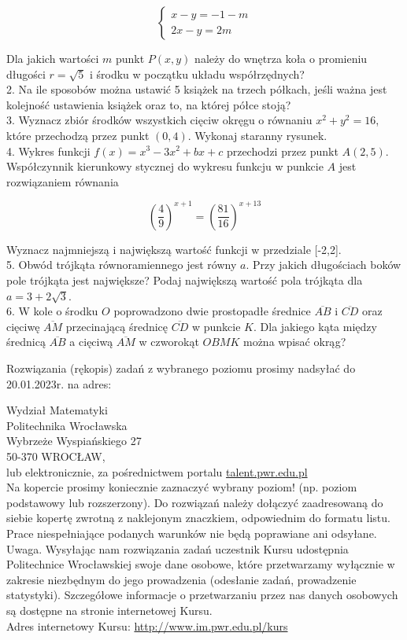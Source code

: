 \documentclass[10pt]{article}
\begin{document}
$$
\left\{\begin{array}{l}
x-y=-1-m \\
2 x-y=2 m
\end{array}\right.
$$

Dla jakich wartości $m$ punkt $P(x, y)$ należy do wnętrza koła o promieniu długości $r=\sqrt{5}$ i środku w początku układu współrzędnych?\\
2. Na ile sposobów można ustawić 5 książek na trzech półkach, jeśli ważna jest kolejność ustawienia książek oraz to, na której półce stoją?\\
3. Wyznacz zbiór środków wszystkich cięciw okręgu o równaniu $x^{2}+y^{2}=16$, które przechodzą przez punkt $(0,4)$. Wykonaj staranny rysunek.\\
4. Wykres funkcji $f(x)=x^{3}-3 x^{2}+b x+c$ przechodzi przez punkt $A(2,5)$. Współczynnik kierunkowy stycznej do wykresu funkcju w punkcie $A$ jest rozwiązaniem równania

$$
\left(\frac{4}{9}\right)^{x+1}=\left(\frac{81}{16}\right)^{x+13}
$$

Wyznacz najmniejszą i największą wartość funkcji w przedziale [-2,2].\\
5. Obwód trójkąta równoramiennego jest równy $a$. Przy jakich długościach boków pole trójkąta jest największe? Podaj największą wartość pola trójkąta dla $a=3+2 \sqrt{3}$.\\
6. W kole o środku $O$ poprowadzono dwie prostopadłe średnice $\overline{A B}$ i $\overline{C D}$ oraz cięciwę $\overline{A M}$ przecinającą średnicę $\overline{C D}$ w punkcie $K$. Dla jakiego kąta między średnicą $\overline{A B}$ a cięciwą $\overline{A M}$ w czworokąt $O B M K$ można wpisać okrąg?

Rozwiązania (rękopis) zadań z wybranego poziomu prosimy nadsyłać do 20.01.2023r. na adres:

Wydział Matematyki\\
Politechnika Wrocławska\\
Wybrzeże Wyspiańskiego 27\\
50-370 WROCŁAW,\\
lub elektronicznie, za pośrednictwem portalu \href{http://talent.pwr.edu.pl}{talent.pwr.edu.pl}\\
Na kopercie prosimy koniecznie zaznaczyć wybrany poziom! (np. poziom podstawowy lub rozszerzony). Do rozwiązań należy dołączyć zaadresowaną do siebie kopertę zwrotną z naklejonym znaczkiem, odpowiednim do formatu listu. Prace niespełniające podanych warunków nie będą poprawiane ani odsyłane.\\
Uwaga. Wysyłając nam rozwiązania zadań uczestnik Kursu udostępnia Politechnice Wrocławskiej swoje dane osobowe, które przetwarzamy wyłącznie w zakresie niezbędnym do jego prowadzenia (odesłanie zadań, prowadzenie statystyki). Szczegółowe informacje o przetwarzaniu przez nas danych osobowych są dostępne na stronie internetowej Kursu.\\
Adres internetowy Kursu: \href{http://www.im.pwr.edu.pl/kurs}{http://www.im.pwr.edu.pl/kurs}
\end{document}
